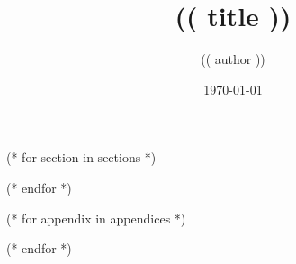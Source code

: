 \documentclass{(( klass ))}
\title{(( title ))}
\author{(( author ))}
\date{\today}
\begin{document}
  \maketitle
  \tableofcontents
  \listoffigures
  \listofalgorithms

  (* for section in sections *)
    
  (* endfor *)

  \appendix
  (* for appendix in appendices *)
    
  (* endfor *)
\end{document}

